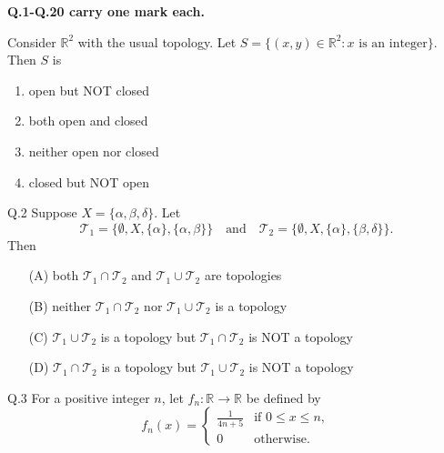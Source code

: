 \documentclass{article}
\begin{document}
																\begin{center}
																    \textbf{Q.1-Q.20 carry one mark each.}
																    \end{center}
																    \vspace{1em}

																     \quad Consider $\mathbb{R}^2$ with the usual topology. Let $S = \{(x, y) \in \mathbb{R}^2 : x \text{ is an integer} \}$. Then $S$ is
																    \vspace{1em}
																    \begin{enumerate} [label=(\Alph*), leftmargin=2em]
																        \item open but NOT closed
																	    \item both open and closed
																	        \item neither open nor closed
																		    \item closed but NOT open
																		    \end{enumerate}
																		    \vspace{1em}

																		    Q.2 \quad Suppose $X = \{ \alpha, \beta, \delta \}$. Let
																		    \[
																		    \mathcal{T}_1 = \{\emptyset, X, \{\alpha\}, \{\alpha, \beta\} \} \quad \text{and} \quad \mathcal{T}_2 = \{\emptyset, X, \{\alpha\}, \{\beta, \delta\} \}.
																		    \]
																		    Then
																		    \begin{itemize}
																		        \item[(A)] both $\mathcal{T}_1 \cap \mathcal{T}_2$ and $\mathcal{T}_1 \cup \mathcal{T}_2$ are topologies
																			    \item[(B)] neither $\mathcal{T}_1 \cap \mathcal{T}_2$ nor $\mathcal{T}_1 \cup \mathcal{T}_2$ is a topology
																			        \item[(C)] $\mathcal{T}_1 \cup \mathcal{T}_2$ is a topology but $\mathcal{T}_1 \cap \mathcal{T}_2$ is NOT a topology
																				    \item[(D)] $\mathcal{T}_1 \cap \mathcal{T}_2$ is a topology but $\mathcal{T}_1 \cup \mathcal{T}_2$ is NOT a topology
																				    \end{itemize}
																				    \vspace{1em}
																				    Q.3 \quad For a positive integer $n$, let $f_n : \mathbb{R} \to \mathbb{R}$ be defined by
																				    \[
																				    f_n(x) = 
																				    \begin{cases}
																				    \frac{1}{4n + 5} & \text{if } 0 \leq x \leq n, \\
																				    0 & \text{otherwise}.
																				    \end{cases}
																				    \]
\end{document}

